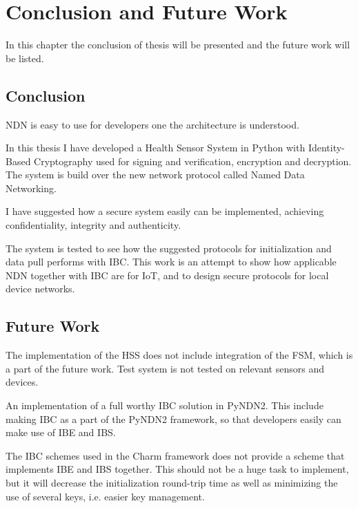 \chapter{Conclusion and Future Work}\label{chp7:conclusion}
In this chapter the conclusion of thesis will be presented and the future work will be listed.

\section{Conclusion}
\gls{NDN} is easy to use for developers one the architecture is understood. 

In this thesis I have developed a Health Sensor System in Python with Identity-Based Cryptography used for signing and verification, encryption and decryption.
The system is build over the new network protocol called Named Data Networking.

I have suggested how a secure system easily can be implemented, achieving confidentiality, integrity and authenticity.

The system is tested to see how the suggested protocols for initialization and data pull performs with \gls{IBC}. 
This work is an attempt to show how applicable \gls{NDN} together with \gls{IBC} are for \gls{IoT}, and to design secure protocols for local device networks.

\section{Future Work}
The implementation of the \gls{HSS} does not include integration of the \gls{FSM}, which is a part of the future work.
Test system is not tested on relevant sensors and devices.

An implementation of a full worthy \gls{IBC} solution in \gls{PyNDN2}.
This include making \gls{IBC} as a part of the PyNDN2 framework, so that developers easily can make use of \gls{IBE} and \gls{IBS}.

The \gls{IBC} schemes used in the Charm framework does not provide a scheme that implements \gls{IBE} and \gls{IBS} together.
This should not be a huge task to implement, but it will decrease the initialization round-trip time as well as minimizing the use of several keys, i.e. easier key management. 
